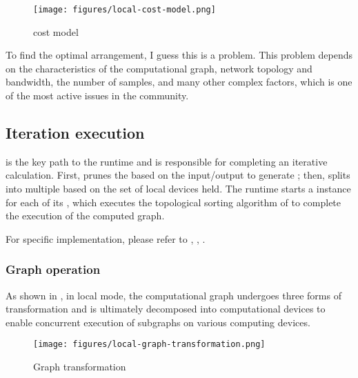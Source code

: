 \begin{figure}[H]
  \centering
  \texttt{[image: figures/local-cost-model.png]}
  \caption{cost model}
  \label{fig:local-cost-model}
\end{figure}

To find the optimal arrangement, I guess this is a  problem. This problem depends on the characteristics of the computational graph, network topology and bandwidth, the number of samples, and many other complex factors, which is one of the most active issues in the community.


\subsection{Iteration execution}
 is the key path to the \tf{} runtime and is responsible for completing an iterative calculation. First,  prunes the  based on the input/output to generate ; then, splits  into multiple  based on the set of local devices held. The runtime starts a  instance for each of its , which executes the topological sorting algorithm of  to complete the execution of the computed graph.

For specific implementation, please refer to , , .


\subsubsection{Graph operation}
As shown in , in local mode, the computational graph undergoes three forms of transformation and is ultimately decomposed into computational devices to enable concurrent execution of subgraphs on various computing devices.

\begin{figure}[H]
  \centering
  \texttt{[image: figures/local-graph-transformation.png]}
  \caption{Graph transformation}
  \label{fig:local-graph-transformation}
\end{figure}

